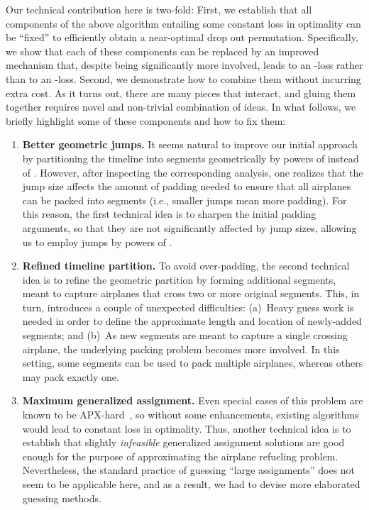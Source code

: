 \documentclass[11pt]{article}
\theoremstyle{plain}
\theoremstyle{definition}
\begin{document}
 Our technical contribution here is two-fold: First, we establish that all components of the above algorithm entailing some constant loss in optimality can be ``fixed'' to efficiently obtain a near-optimal drop out permutation. Specifically, we show that each of these components can be replaced by an improved mechanism that, despite being significantly more involved, leads to an -loss rather than to an -loss. Second, we demonstrate how to combine them without incurring extra cost. As it turns out, there are many pieces that interact, and gluing them together requires novel and non-trivial combination of ideas. 
In what follows, we briefly highlight some of these components and how to fix them:
\begin{enumerate}
\item {\bf Better geometric jumps.} It seems natural to improve our initial approach by partitioning the timeline into segments geometrically by powers of  instead of . However, after inspecting the corresponding analysis, one realizes that the jump size affects the amount of padding needed to ensure that all airplanes can be packed into segments (i.e., smaller jumps mean more padding). For this reason, the first technical idea is to sharpen the initial padding arguments, so that they are not significantly affected by jump sizes, allowing us to employ jumps by powers of .

\item {\bf Refined timeline partition.} To avoid over-padding, the second technical idea is to refine the geometric partition by forming additional segments, meant to capture airplanes that cross two or more original segments. This, in turn, introduces a couple of unexpected difficulties: (a)~Heavy guess work is needed in order to define the approximate length and location of newly-added segments; and (b)~As new segments are meant to capture a single crossing airplane, the underlying packing problem becomes more involved. In this setting, some segments can be used to pack multiple airplanes, whereas others may pack exactly one.

\item {\bf Maximum generalized assignment.} Even special cases of this problem are known to be APX-hard~\cite{ChekuriK05}, so without some enhancements, existing algorithms would lead to constant loss in optimality. Thus, another technical idea is to establish that slightly \textit{infeasible} generalized assignment solutions are good enough for the purpose of approximating the airplane refueling problem. Nevertheless, the standard practice of guessing ``large assignments'' does not seem to be applicable here, and as a result, we had to devise more elaborated guessing methods.


\end{enumerate}
\end{document}
